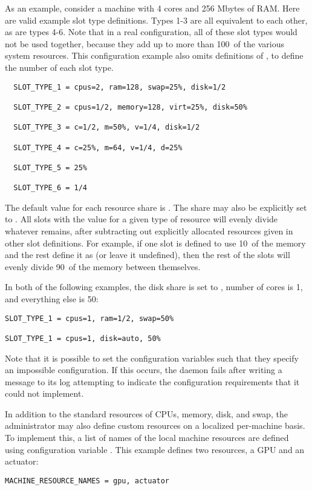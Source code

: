 \begin{description}
As an example, consider a
machine with 4 cores and 256 Mbytes of RAM.
Here are valid example slot type definitions. 
Types 1-3 are all equivalent to each other, as are types 4-6.  Note that
in a real configuration, all of these slot types would not
be used together,
because they add up to more than 100\Percent\ of the various system resources.
This configuration example also omits definitions of
, to define the number of each slot type.

\begin{verbatim}
  SLOT_TYPE_1 = cpus=2, ram=128, swap=25%, disk=1/2

  SLOT_TYPE_2 = cpus=1/2, memory=128, virt=25%, disk=50%

  SLOT_TYPE_3 = c=1/2, m=50%, v=1/4, disk=1/2

  SLOT_TYPE_4 = c=25%, m=64, v=1/4, d=25%

  SLOT_TYPE_5 = 25%

  SLOT_TYPE_6 = 1/4
\end{verbatim}

The default value for each resource share is .  The share
may also be explicitly set to .  All slots with the value
 for a given type of resource will evenly divide
whatever remains,
after subtracting out explicitly
allocated resources given in other slot definitions.  
For example, if one slot is
defined to use 10\Percent\ of the memory and the rest define it as
 (or leave it undefined), then the rest of the slots will
evenly divide 90\Percent\ of the memory between themselves.

In both of the following examples, the disk share is set to ,
number of cores is 1, and everything else is 50\Percent:

\begin{verbatim}
SLOT_TYPE_1 = cpus=1, ram=1/2, swap=50%

SLOT_TYPE_1 = cpus=1, disk=auto, 50%
\end{verbatim}

Note that it is possible to set the configuration variables such
that they specify an impossible configuration.
If this occurs, the  daemon fails after writing
a message to its log attempting to indicate the configuration
requirements that it could not implement.

In addition to the standard resources of CPUs, memory, disk, and swap,
the administrator may also define custom resources on 
a localized per-machine basis.
To implement this, 
a list of names of the local machine resources are defined using configuration 
variable .
This example defines two resources,
a GPU and an actuator:
\begin{verbatim}
MACHINE_RESOURCE_NAMES = gpu, actuator
\end{verbatim}


\end{description}
